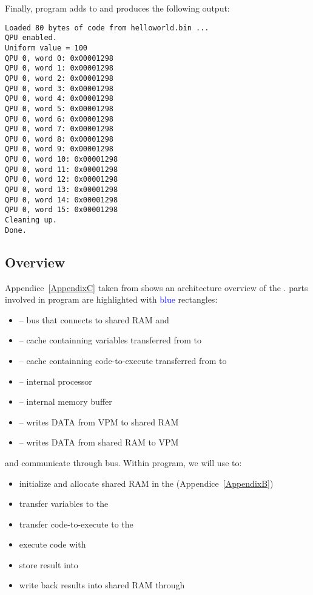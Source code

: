 Finally, program adds  to  and produces the following output:

\begin{lstlisting}
Loaded 80 bytes of code from helloworld.bin ...
QPU enabled.
Uniform value = 100
QPU 0, word 0: 0x00001298
QPU 0, word 1: 0x00001298
QPU 0, word 2: 0x00001298
QPU 0, word 3: 0x00001298
QPU 0, word 4: 0x00001298
QPU 0, word 5: 0x00001298
QPU 0, word 6: 0x00001298
QPU 0, word 7: 0x00001298
QPU 0, word 8: 0x00001298
QPU 0, word 9: 0x00001298
QPU 0, word 10: 0x00001298
QPU 0, word 11: 0x00001298
QPU 0, word 12: 0x00001298
QPU 0, word 13: 0x00001298
QPU 0, word 14: 0x00001298
QPU 0, word 15: 0x00001298
Cleaning up.
Done.
\end{lstlisting}


\subsection{\vc{} Overview}



Appendice~\ref{AppendixC} taken from \parencite{refVC} shows an architecture overview of the \vc.  parts involved in  program are highlighted with \textcolor{blue}{blue} rectangles:




\begin{itemize}
	\item {} -- bus that connects \vc{} to shared RAM and \cpu
	\item {} -- cache containning variables transferred from \cpu{} to \vc
	\item {} -- cache containning code-to-execute transferred from \cpu{} to \vc
	\item {} -- \vc{} internal processor
	\item {} -- \vc{} internal memory buffer
	\item {} -- writes DATA from VPM to shared RAM
	\item {} -- writes DATA from shared RAM to VPM
\end{itemize}
\vspace{5 mm}

\cpu{} and \vc{} communicate through  bus. Within  program, we will use \cpu{} to:
\begin{itemize}
	\item initialize and allocate shared RAM in the  (Appendice~\ref{AppendixB})
	\item transfer variables to the 
	\item transfer code-to-execute to the 
	\item execute code with 
	\item store result into 
	\item write back results into shared RAM through 
\end{itemize}



